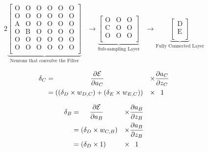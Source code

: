 \documentclass[xcolor={table}]{beamer}
\begin{document}
 \begin{frame} 
\begin{alignat}{2}
\underbrace{
\begin{bmatrix}
\text{O} & \text{O} & \text{O} & \text{O} & \text{O} & \text{O} \\
\text{O} & \text{O} & \text{O} & \text{O} & \text{O} & \text{O} \\
\text{A} & \text{O} & \text{O} & \text{O} & \text{O} & \text{O} \\
\text{O} & \text{B} & \text{O} & \text{O} & \text{O} & \text{O} \\
\text{O} & \text{O} & \text{O} & \text{O} & \text{O} & \text{O} \\
\text{O} & \text{O} & \text{O} & \text{O} & \text{O} & \text{O} \\
\end{bmatrix}
}_{\text{Neurons that convolve the Filter}}
&\rightarrow 
\underbrace{
\begin{bmatrix}
\text{O} & \text{O} & \text{O}\\
\text{C} & \text{O} & \text{O}\\
\text{O} & \text{O} & \text{O}\\
\end{bmatrix}
}_{\text{Sub-sampling Layer}}
&\rightarrow 
\underbrace{
\begin{bmatrix}
\text{D}\\
\text{E}\\
\end{bmatrix}
}_{\text{Fully Connected Layer}}
\label{eq:cnn-backprop-example} 
\end{alignat}
\end{frame} 



 \begin{frame} 
\begin{alignat}{2}
\delta_C &= \hspace{1.8cm}\frac{\partial \mathcal{E}}{\partial a_C} &\times &\frac{\partial a_C}{ \partial z_C} \notag\\ 
~ &= \left( \left( \delta_D \times w_{D,C} \right) + \left( \delta_E \times w_{E,C} \right) \right) & \times & \phantom{O}1 \notag\\
\label{eqn:neuronCdelta}
\end{alignat}
\end{frame} 



 \begin{frame} 
\begin{alignat}{2}
\delta_B &= \hspace{0.45cm}\frac{\partial \mathcal{E}}{\partial a_B} &\times &\frac{\partial a_B}{ \partial z_B} \notag\\ 
~ &= \left( \delta_D \times w_{C,B} \right) & \times & \frac{\partial a_B}{ \partial z_B} \notag\\
~ &= \left( \delta_D \times 1 \right) & \times & \phantom{O}1 \notag\\
\label{eqn:neuronBdelta}
\end{alignat}
\end{frame} 
\end{document}
